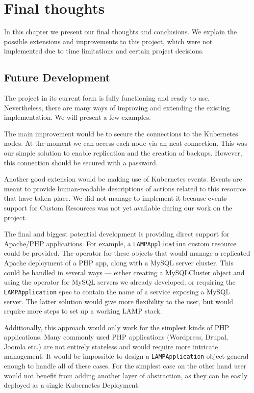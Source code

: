 \chapter{Final thoughts}
In this chapter we present our final thoughts and conclusions. We explain the possible extensions
and improvements to this project, which were not implemented due to time limitations and certain
project decisions.

\section{Future Development}
The project in its current form is fully functioning and ready to use. Nevertheless, there are many
ways of improving and extending the existing implementation. We will present a few examples.

The main improvement would be to secure the connections to the Kubernetes nodes. At the moment we
can access each node via an ncat connection. This was our simple solution to enable replication and
the creation of backups. However, this connection should be secured with a password.

Another good extension would be making use of Kubernetes events. Events are meant to provide
human-readable descriptions of actions related to this resource that have taken place. We did not
manage to implement it because events support for Custom Resources was not yet available during our
work on the project.

The final and biggest potential development is providing direct support for Apache/PHP applications.
For example, a \texttt{LAMPApplication} custom resource could be provided. The operator for these objects
that would manage a replicated Apache deployment of a PHP app, along with a MySQL server cluster.
This could be handled in several ways --- either creating a MySQLCluster object and using the
operator for MySQL servers we already developed, or requiring the \texttt{LAMPApplication} spec to contain
the name of a service exposing a MySQL server. The latter solution would give more flexibility to
the user, but would require more steps to set up a working LAMP stack.

Additionally, this approach would only work for the simplest kinds of PHP applications.
Many commonly used PHP applications (Wordpress, Drupal, Joomla etc.) are not entirely stateless and
would require more intricate management. It would be impossible to design a \texttt{LAMPApplication} object
general enough to handle all of these cases. For the simplest case on the other hand user would not
benefit from adding another layer of abstraction, as they can be easily deployed as a single
Kubernetes Deployment.

